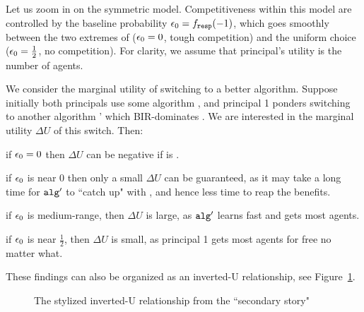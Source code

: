 Let us zoom in on the symmetric  \HardMaxRandom model. Competitiveness within this model are controlled by the baseline probability $\epsilon_0 = f_{\mathtt{resp}}(- 1)$, which goes smoothly between the two extremes of \HardMax ($\epsilon_0=0$, tough competition) and the uniform choice ($\epsilon_0=\tfrac12$, no competition). For clarity, we assume that principal's utility is the number of agents.

\newcommand{\deltaU}{\Delta U}

We consider the marginal utility of switching to a better algorithm. Suppose initially both principals use some algorithm \alg, and principal 1 ponders switching to another algorithm \alg' which BIR-dominates \alg. We are interested in the marginal utility $\deltaU$ of this switch. Then:

\begin{OneLiners}
\item if $\epsilon_0 = 0$ then $\deltaU$ can be negative if \alg is \DynGreedy.

\item if $\epsilon_0$ is near $0$ then only a small $\deltaU$ can be guaranteed, as it may take a long time for $\mathtt{alg}_{}'$ to ``catch up" with \alg, and hence less time to reap the benefits.

\item if $\epsilon_0$ is medium-range, then $\deltaU$ is large, as $\mathtt{alg}_{}'$ learns fast and gets most agents.

\item if $\epsilon_0$ is near $\tfrac12$, then $\deltaU$ is small, as principal 1 gets most agents for free no matter what.
\end{OneLiners}
These findings can also be organized as an inverted-U relationship, see Figure~\ref{fig:inverted-U3}.

\begin{figure}[t]
\begin{center}

\caption{The stylized inverted-U relationship from the ``secondary story"}
\label{fig:inverted-U3}
\end{center}
\end{figure}


